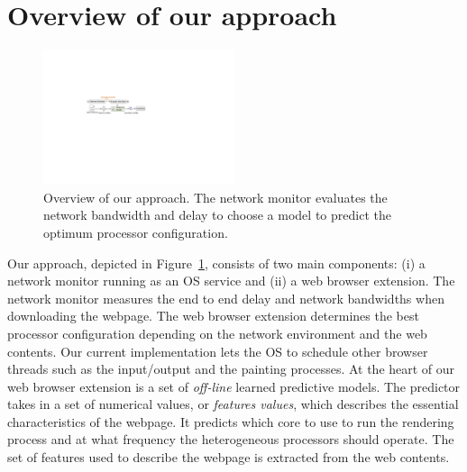 \section{Overview of our approach}

\begin{figure}
\begin{center}
\includegraphics[width=0.5\textwidth]{figure/predictor.pdf}
\end{center}
\caption{Overview of our approach. The network monitor evaluates the network bandwidth and delay to choose a model to predict the
optimum processor configuration. }
\vspace{-4mm}
\label{fig:predictor}
\end{figure}





Our approach, depicted in Figure~\ref{fig:predictor}, consists of two main components: (i) a network monitor running as an OS service and
(ii) a web browser extension. The network monitor measures the end to end delay and network bandwidths when downloading the webpage. The
web browser extension determines the best processor configuration depending on the network environment and the web contents. Our current
implementation lets the OS to schedule other browser threads such as the input/output and the painting processes. At the heart of our web
browser extension is a set of \emph{off-line} learned predictive models. The predictor takes in a set of numerical values, or
\emph{features values}, which describes the essential characteristics of the webpage. It predicts which core to use to run the rendering
process and at what frequency the heterogeneous processors should operate. The set of features used to describe the webpage is extracted
from the web contents.



